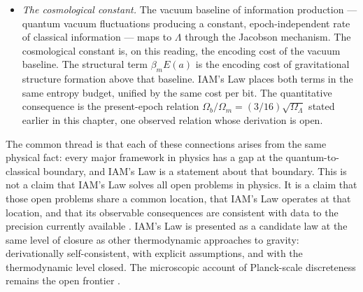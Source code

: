 \begin{itemize}
foundational mystery into a thermodynamic transaction. The transition occurs when a quantum system interacts irreversibly with its environment, producing
classical information at cost $k_BT_H\ln2$ per bit. The transition is not instantaneous collapse but the irreversible orthogonalization of environmental
states described by Eq.~\eqref{eq:law_entangle}. IAM's Law identifies the thermodynamic cost of the transition and shows that this cost, accumulated over cosmic history, has observable cosmological consequences, consistent with current data (Table~\ref{tab:law_consistency}; Chapter~\ref{ch:measurement}); the measurement problem at the level of a complete quantum theory of gravity remains open.
\item \emph{The cosmological constant.} The vacuum baseline of information production --- quantum vacuum fluctuations producing a constant,
epoch-independent rate of classical information --- maps to $\Lambda$ through the Jacobson mechanism. The cosmological constant is, on this reading, the
encoding cost of the vacuum baseline. The structural term $\beta_mE(a)$ is the encoding cost of gravitational structure formation above that baseline.
IAM's Law places both terms in the same entropy budget, unified by the same cost per bit. The quantitative consequence is the present-epoch relation
$\Omega_b/\Omega_m=(3/16)\sqrt{\Omega_\Lambda}$ stated earlier in this chapter, one observed relation whose derivation is open.
\end{itemize}
The common thread is that each of these connections arises from the same physical fact: every major framework in physics has a gap at the
quantum-to-classical boundary, and IAM's Law is a statement about that boundary. This is not a claim that IAM's Law solves all open problems in physics. It
is a claim that those open problems share a common location, that IAM's Law operates at that location, and that its observable consequences are consistent
with data to the precision currently available \interp. IAM's Law is presented as a candidate law at the same level of closure as other thermodynamic
approaches to gravity: derivationally self-consistent, with explicit assumptions, and with the thermodynamic level closed. The microscopic account of
Planck-scale discreteness remains the open frontier \openprob.

